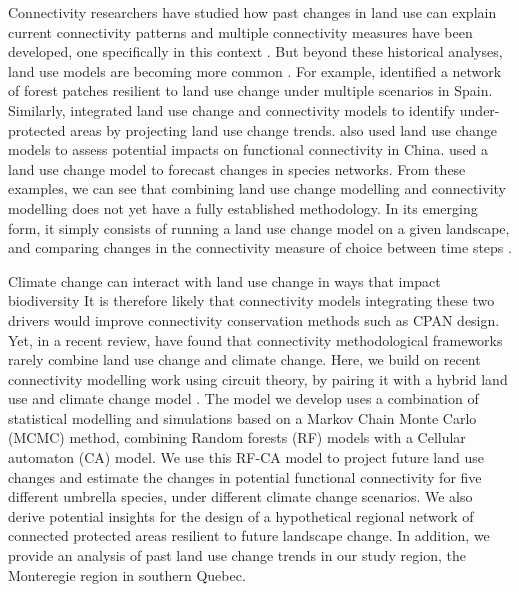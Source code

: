 Connectivity researchers have studied how past changes in land use can explain current connectivity patterns \citep{dupras_urban_2015, henareh_khalyani_spatial_2013, vergara_deforestation_2013, patru-stupariu_using_2013} and multiple connectivity measures have been developed, one specifically in this context \citep{saura_new_2007}. But beyond these historical analyses, land use models are becoming more common \citep{correa_ayram_habitat_2015}. For example, \cite{rubio_sustaining_2012} identified a network of forest patches resilient to land use change under multiple scenarios in Spain. Similarly, \cite{piquer-rodriguez_future_2012} integrated land use change and connectivity models to identify under-protected areas by projecting land use change trends. \cite{huang_simulating_2018} also used land use change models to assess potential impacts on functional connectivity in China. \cite{albert_applying_2017} used a land use change model to forecast changes in species networks. From these examples, we can see that combining land use change modelling and connectivity modelling does not yet have a fully established methodology. In its emerging form, it simply consists of running a land use change model on a given landscape, and comparing changes in the connectivity measure of choice between time steps \citep{perkl_urban_2018}.

Climate change can interact with land use change in ways that impact biodiversity \citep{oliver_interactions_2014} It is therefore likely that connectivity models integrating these two drivers would improve connectivity conservation methods such as CPAN design. Yet, in a recent review, \cite{costanza_landscape_2019} have found that connectivity methodological frameworks rarely combine  land use change and climate change. Here, we build on recent connectivity modelling work using circuit theory, by pairing it with a hybrid land use and climate change model \citep{albert_applying_2017}. The model we develop uses a combination of statistical modelling and simulations based on a Markov Chain Monte Carlo (MCMC) method, combining Random forests (RF) models with a Cellular automaton (CA) model. We use this RF-CA model to project future land use changes and estimate the changes in potential functional connectivity for five different umbrella species, under different climate change scenarios. We also derive potential insights for the design of a hypothetical regional network of connected protected areas resilient to future landscape change. In addition, we provide an analysis of past land use change trends in our study region, the Monteregie region in southern Quebec.

